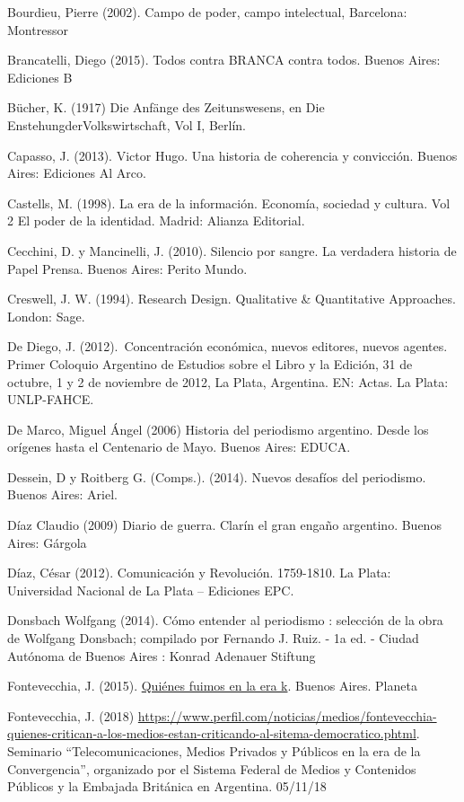 Bourdieu, Pierre (2002). Campo de poder, campo intelectual, Barcelona: Montressor

Brancatelli, Diego (2015). Todos contra BRANCA contra todos. Buenos Aires: Ediciones B

Bücher, K. (1917) Die Anfänge des Zeitunswesens, en Die EnstehungderVolkswirtschaft, Vol I, Berlín.

Capasso, J. (2013). Victor Hugo. Una historia de coherencia y convicción. Buenos Aires: Ediciones Al Arco.

Castells, M. (1998). La era de la información. Economía, sociedad y cultura. Vol 2 El poder de la identidad. Madrid: Alianza Editorial.

Cecchini, D. y Mancinelli, J. (2010). Silencio por sangre. La verdadera historia de Papel Prensa. Buenos Aires: Perito Mundo.

Creswell, J. W. (1994). Research Design. Qualitative \& Quantitative Approaches. London: Sage.

De Diego, J. (2012).~Concentración económica, nuevos editores, nuevos agentes. Primer Coloquio Argentino de Estudios sobre el Libro y la Edición, 31 de octubre, 1 y 2 de noviembre de 2012, La Plata, Argentina. EN: Actas. La Plata: UNLP-FAHCE.

De Marco, Miguel Ángel (2006) Historia del periodismo argentino. Desde los orígenes hasta el Centenario de Mayo. Buenos Aires: EDUCA.

Dessein, D y Roitberg G. (Comps.). (2014). Nuevos desafíos del periodismo. Buenos Aires: Ariel.

Díaz Claudio (2009) Diario de guerra. Clarín el gran engaño argentino. Buenos Aires: Gárgola

Díaz, César (2012). Comunicación y Revolución. 1759-1810. La Plata: Universidad Nacional de La Plata -- Ediciones EPC.

Donsbach Wolfgang (2014). Cómo entender al periodismo : selección de la obra de Wolfgang Donsbach; compilado por Fernando J. Ruiz. - 1a ed. - Ciudad Autónoma de Buenos Aires : Konrad Adenauer Stiftung

Fontevecchia, J. (2015). \href{https://www.boutiquedellibro.com.ar/9789504946175/Quienes+Fuimos+En+La+Era+K/}{Quiénes fuimos en la era k}. Buenos Aires. Planeta

Fontevecchia, J. (2018) \url{https://www.perfil.com/noticias/medios/fontevecchia-quienes-critican-a-los-medios-estan-criticando-al-sitema-democratico.phtml}. Seminario ``Telecomunicaciones, Medios Privados y Públicos en la era de la Convergencia'', organizado por el Sistema Federal de Medios y Contenidos Públicos y la Embajada Británica en Argentina. 05/11/18

